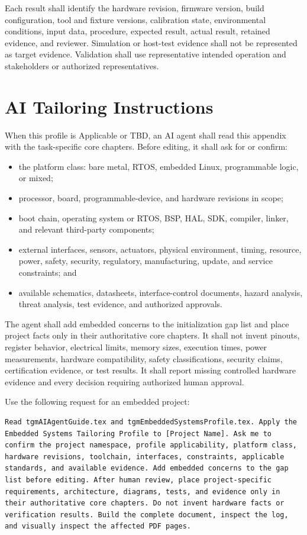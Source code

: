 Each result shall identify the hardware revision, firmware version, build
configuration, tool and fixture versions, calibration state, environmental
conditions, input data, procedure, expected result, actual result, retained
evidence, and reviewer. Simulation or host-test evidence shall not be
represented as target evidence. Validation shall use representative intended
operation and stakeholders or authorized representatives.

\section{AI Tailoring Instructions}
When this profile is Applicable or TBD, an AI agent shall read this appendix
with the task-specific core chapters. Before editing, it shall ask for or
confirm:

\begin{itemize}
\item the platform class: bare metal, RTOS, embedded Linux, programmable logic,
or mixed;
\item processor, board, programmable-device, and hardware revisions in scope;
\item boot chain, operating system or RTOS, BSP, HAL, SDK, compiler, linker,
and relevant third-party components;
\item external interfaces, sensors, actuators, physical environment, timing,
resource, power, safety, security, regulatory, manufacturing, update, and
service constraints; and
\item available schematics, datasheets, interface-control documents, hazard
analysis, threat analysis, test evidence, and authorized approvals.
\end{itemize}

The agent shall add embedded concerns to the initialization gap list and place
project facts only in their authoritative core chapters. It shall not invent
pinouts, register behavior, electrical limits, memory sizes, execution times,
power measurements, hardware compatibility, safety classifications, security
claims, certification evidence, or test results. It shall report missing
controlled hardware evidence and every decision requiring authorized human
approval.

Use the following request for an embedded project:

\begin{verbatim}
Read tgmAIAgentGuide.tex and tgmEmbeddedSystemsProfile.tex. Apply the
Embedded Systems Tailoring Profile to [Project Name]. Ask me to
confirm the project namespace, profile applicability, platform class,
hardware revisions, toolchain, interfaces, constraints, applicable
standards, and available evidence. Add embedded concerns to the gap
list before editing. After human review, place project-specific
requirements, architecture, diagrams, tests, and evidence only in
their authoritative core chapters. Do not invent hardware facts or
verification results. Build the complete document, inspect the log,
and visually inspect the affected PDF pages.
\end{verbatim}

